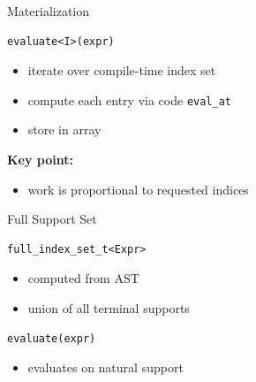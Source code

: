 \documentclass{beamer}
\begin{document}

\begin{frame}[fragile]{Materialization}

\begin{lstlisting}
evaluate<I>(expr)
\end{lstlisting}

\vspace{1em}

\begin{itemize}
\item iterate over compile-time index set
\item compute each entry via code \lstinline!eval_at!
\item store in array
\end{itemize}

\vspace{1em}

\textbf{Key point:}
\begin{itemize}
\item work is proportional to requested indices
\end{itemize}

\end{frame}


\begin{frame}[fragile]{Full Support Set}

\begin{lstlisting}
full_index_set_t<Expr>
\end{lstlisting}

\vspace{1em}

\begin{itemize}
\item computed from AST
\item union of all terminal supports
\end{itemize}

\vspace{1em}

\begin{lstlisting}
evaluate(expr)
\end{lstlisting}

\vspace{1em}

\begin{itemize}
\item evaluates on natural support
\end{itemize}

\end{frame}
\end{document}
